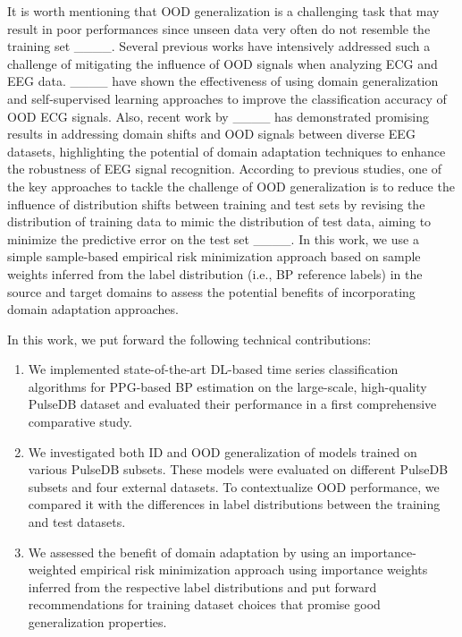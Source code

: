 It is worth mentioning that OOD generalization is a challenging task that may result in poor performances since unseen data very often do not resemble the training set ____. Several previous works have intensively addressed such a challenge of mitigating the influence of OOD signals when analyzing ECG and EEG data. ____ have shown the effectiveness of using domain generalization and self-supervised learning approaches to improve the classification accuracy of OOD ECG signals. Also, recent work by ____ has demonstrated promising results in addressing domain shifts and OOD signals between diverse EEG datasets, highlighting the potential of domain adaptation techniques to enhance the robustness of EEG signal recognition. According to previous studies, one of the key approaches to tackle the challenge of OOD generalization is to reduce the influence of distribution shifts between training and test sets by revising the distribution of training data to mimic the distribution of test data, aiming to minimize the predictive error on the test set ____.
In this work, we use a simple sample-based empirical risk minimization approach based on sample weights inferred from the label distribution (i.e., BP reference labels) in the source and target domains to assess the potential benefits of incorporating domain adaptation approaches. 

In this work, we put forward the following technical contributions:


\begin{enumerate}

 


\item We implemented state-of-the-art DL-based time series classification algorithms for PPG-based BP estimation on the large-scale, high-quality PulseDB dataset and evaluated their performance in a first comprehensive comparative study. 

\item We investigated both ID and OOD generalization of models trained on various PulseDB subsets. These models were evaluated on different PulseDB subsets and four external datasets. To contextualize OOD performance, we compared it with the differences in label distributions between the training and test datasets.




\item We assessed the benefit of domain adaptation by using an importance-weighted empirical risk minimization approach using importance weights inferred from the respective label distributions and put forward recommendations for training dataset choices that promise good generalization properties.


\end{enumerate}